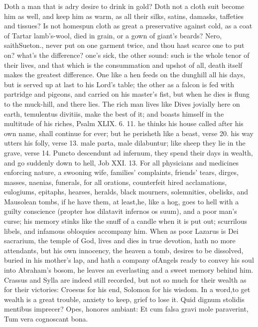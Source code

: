 {Doth a man that is adry desire to drink in gold? Doth not a cloth suit
become him as well, and keep him as warm, as all their silks, satins,
damasks, taffeties and tissues? Is not homespun cloth as great a
preservative against cold, as a coat of Tartar lamb's-wool, died in
grain, or a gown of giant's beards? Nero, saithSueton., never put
on one garment twice, and thou hast scarce one to put on? what's the
difference? one's sick, the other sound: such is the whole tenor of
their lives, and that which is the consummation and upshot of all,
death itself makes the greatest difference. One like a hen feeds on the
dunghill all his days, but is served up at last to his Lord's table;
the other as a falcon is fed with partridge and pigeons, and carried on
his master's fist, but when he dies is flung to the muck-hill, and
there lies. The rich man lives like Dives jovially here on earth,
temulentus divitiis, make the best of it; and boasts himself in the
multitude of his riches, Psalm XLIX. 6. 11. he thinks his house called
after his own name, shall continue for ever; but he perisheth like a
beast, verse 20. his way utters his folly, verse 13. male parta, male
dilabuntur; like sheep they lie in the grave, verse 14. Puncto
descendunt ad infernum, they spend their days in wealth, and go
suddenly down to hell, Job XXI. 13. For all physicians and medicines
enforcing nature, a swooning wife, families' complaints, friends'
tears, dirges, masses, naenias, funerals, for all orations, counterfeit
hired acclamations, eulogiums, epitaphs, hearses, heralds, black
mourners, solemnities, obelisks, and Mausolean tombs, if he have them,
at least,he, like a hog, goes to hell with a guilty conscience
(propter hos dilatavit infernos os suum), and a poor man's curse; his
memory stinks like the snuff of a candle when it is put out; scurrilous
libels, and infamous obloquies accompany him. When as poor Lazarus is
Dei sacrarium, the temple of God, lives and dies in true devotion, hath
no more attendants, but his own innocency, the heaven a tomb, desires
to be dissolved, buried in his mother's lap, and hath a company
ofAngels ready to convey his soul into Abraham's bosom, he leaves
an everlasting and a sweet memory behind him. Crassus and Sylla are
indeed still recorded, but not so much for their wealth as for their
victories: Croesus for his end, Solomon for his wisdom. In a
word,to get wealth is a great trouble, anxiety to keep, grief to
lose it.
Quid dignum stolidis mentibus imprecer?
Opes, honores ambiant:
Et cum falsa gravi mole paraverint,
Tum vera cognoscant bona.

}
